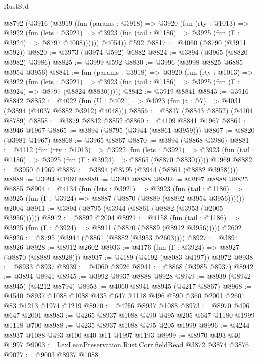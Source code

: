 \begin{lexlean}{RustStd}
\begin{coremodule}
    @8792
      (@3916
        (@3919
          (fun (params : @3918) =>
          @3920
            (fun (rty : @1013) =>
            @3922
              (fun (lets : @3921) =>
              @3923 (fun (tail : @1186) => @3925 (fun (Γ : @3924) => @8797 @4008))))))
        @4054))
    @592
@8817 := @4060 (@8790 (@3911 @592))
@8820 := @3973 (@3974 @592) @6882
@8824 := @3894 (@3965 (@8820 @3982) @3986)
@8825 := @3999 @592
@8830 := @3996 (@3998 @8825 @6885 @3954 @3956)
@8841 := fun (params : @3918) =>
  @3920
    (fun (rty : @1013) =>
    @3922
      (fun (lets : @3921) =>
      @3923 (fun (tail : @1186) => @3925 (fun (Γ : @3924) => @8797 (@8824 @8830)))))
@8842 := @3919 @8841
@8843 := @3916 @8842
@8852 := @4022 (fun (U : @4021) => @4023 (fun (t : @7) => @4031 (@3894 (@4037 @6882 @3912) @4048)))
@8856 := @8817 (@8843 @8852) (@4104 @8789)
@8858 := @3879 @8842 @8852
@8860 := @4109 @8841 @1967
@8861 := @3946 @1967
@8865 := @3894 (@8795 (@3944 (@8861 @3959)))
@8867 := @8820 (@3981 @1967)
@8868 := @3965 @8867
@8870 := @3894 (@8868 @3986)
@8881 := @4112
    (fun (rty : @1013) =>
    @3922
      (fun (lets : @3921) =>
      @3923 (fun (tail : @1186) => @3925 (fun (Γ : @3924) => @8865 (@8870 @8830)))))
    @1969
@8882 := @3950 @1969
@8887 := @3894 (@8795 (@3944 (@8861 (@8882 @3958))))
@8888 := @3994 @1969
@8889 := @3993 @8888
@8892 := @3997 @8888 @8825 @6885
@8904 := @4134
    (fun (lets : @3921) =>
    @3923
      (fun (tail : @1186) => @3925 (fun (Γ : @3924) => @8887 (@8870 (@8889 (@8892 @3954 @3956))))))
    @2004
@8911 := @3894 (@8795 (@3944 (@8861 (@8882 (@3953 (@2005 @3956))))))
@8912 := @8892 @2004
@8921 := @4158
    (fun (tail : @1186) => @3925 (fun (Γ : @3924) => @8911 (@8870 (@8889 (@8912 @3956)))))
    @2602
@8926 := @8795 (@3944 (@8861 (@8882 (@3953 @2603))))
@8927 := @3894 @8926
@8928 := @8912 @2602
@8933 := @4176 (fun (Γ : @3924) => @8927 (@8870 (@8889 @8928)))
@8937 := @4189 (@4192 (@8083 @4197)) @3972
@8938 := @8933 @8937
@8939 := @4060 @8926
@8941 := @8868 (@3985 @8937)
@8942 := @3894 @8941
@8945 := @3992 @8937 @8888 @8928
@8949 := @8939 (@8942 @8945) (@4212 @8794)
@8953 := @4060 @8941 @8945 (@4217 @8867)
@8968 := @4540 @8937 @1088 @1088 @435 @647 @1118 @496 @590 @360 @2001 @2601 @83 @1213 @1974 @1219
@8970 := @4256 @8937 @1088
@8973 := @8970 @496 @647 @2001
@8983 := @4265 @8937 @1088 @490 @495 @205 @647 @1180 @1999 @1118 @700
@8988 := @4235 @8937 @1088 @495 @205 @1999
@8996 := @4244 @8937 @1088 @493 @100 @40 @11 @1997 @1193
@8999 := @8970 @493 @40 @1997
@9003 := LexLeanPreservation.Rust.Corr.fieldRead @3872 @3874 @3876
@9027 := @9003
    @8937
    @1088

\end{coremodule}
\end{lexlean}
